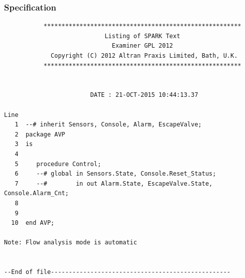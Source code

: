 \documentclass[a4paper, titlepage]{article}
\begin{document}
\subsubsection{Specification}
{\small
\begin{lstlisting}
           *******************************************************
                            Listing of SPARK Text
                              Examiner GPL 2012
             Copyright (C) 2012 Altran Praxis Limited, Bath, U.K.
           *******************************************************


                        DATE : 21-OCT-2015 10:44:13.37

Line
   1  --# inherit Sensors, Console, Alarm, EscapeValve;
   2  package AVP
   3  is
   4           
   5     procedure Control;
   6     --# global in Sensors.State, Console.Reset_Status;
   7     --#        in out Alarm.State, EscapeValve.State, Console.Alarm_Cnt;
   8  
   9     
  10  end AVP;

Note: Flow analysis mode is automatic


--End of file--------------------------------------------------

\end{lstlisting}
}
\end{document}
